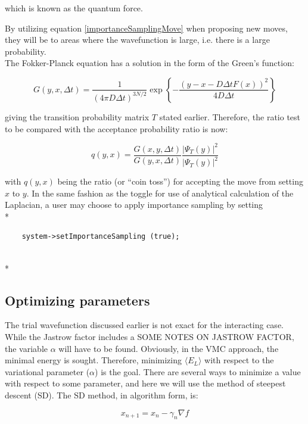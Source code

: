 \documentclass[english, a4paper]{article}
\begin{document}
which is known as the quantum force.

By utilizing equation \eqref{importanceSamplingMove} when proposing new moves, they will be to areas where the wavefunction is large, i.e. there is a large probability.\\
The Fokker-Planck equation has a solution in the form of the Green's function:

\begin{equation}
 G(y,x,\Delta t) = \frac{1}{(4\pi D\Delta t)^{3N/2}}\exp\left\{-\frac{(y-x-D\Delta tF(x))^2}{4D\Delta t}\right\}
\end{equation}

giving the transition probability matrix $T$ stated earlier. Therefore, the ratio test to be compared with the acceptance probability ratio is now:

\begin{equation}
 q(y,x) = \frac{G(x,y,\Delta t)}{G(y,x,\Delta t)}\frac{|\Psi_T(y)|^2}{|\Psi_T(y)|^2}
\end{equation}

with $q(y,x)$ being the ratio (or ``coin toss'') for accepting the move from setting $x$ to $y$.
In the same fashion as the toggle for use of analytical calculation of the Laplacian, a user may choose to apply importance sampling by setting 
\\*

\begin{verbatim}
	system->setImportanceSampling (true);
\end{verbatim}
\\*


\subsection{Optimizing parameters}
The trial wavefunction discussed earlier is not exact for the interacting case. While the Jastrow factor includes a SOME NOTES ON JASTROW FACTOR, the variable $\alpha$ will have to be found.
Obviously, in the VMC approach, the minimal energy is sought. Therefore, minimizing $\langle E_L\rangle$ with respect to the variational parameter ($\alpha$) is the goal.
There are several ways to minimize a value with respect to some parameter, and here we will use the method of steepest descent (SD). The SD method, in algorithm form, is:

\begin{equation}
x_{n+1} = x_n - \gamma_n\nabla f
\end{equation}
\end{document}
